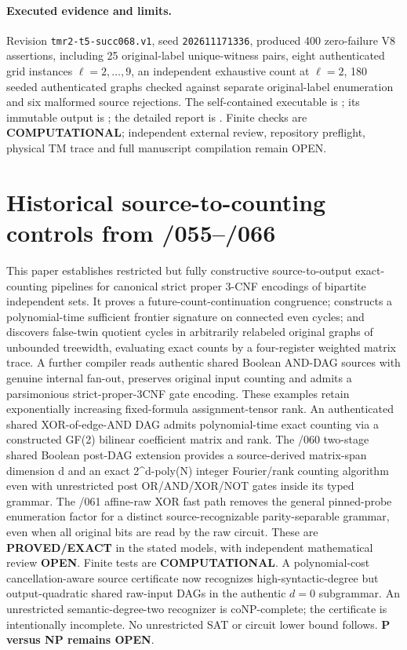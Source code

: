 \documentclass[11pt]{article}
\begin{document}
\paragraph{Executed evidence and limits.}
Revision \texttt{tmr2-t5-succ068.v1}, seed
\texttt{202611171336}, produced 400 zero-failure V8
assertions, including 25 original-label
unique-witness pairs, eight authenticated grid
instances $\ell=2,\ldots,9$, an independent
exhaustive count at $\ell=2$, 180 seeded
authenticated graphs checked against separate
original-label enumeration and six malformed
source rejections. The self-contained executable is
;
its immutable output is
;
the detailed report is
.
Finite checks are \textbf{COMPUTATIONAL}; independent
external review, repository preflight, physical TM
trace and full manuscript compilation remain OPEN.

\section{Historical source-to-counting controls from /055--/066}
This paper establishes restricted but fully constructive source-to-output exact-counting pipelines for canonical strict proper 3-CNF encodings of bipartite independent sets. It proves a future-count-continuation congruence; constructs a polynomial-time sufficient frontier signature on connected even cycles; and discovers false-twin quotient cycles in arbitrarily relabeled original graphs of unbounded treewidth, evaluating exact counts by a four-register weighted matrix trace. A further compiler reads authentic shared Boolean AND-DAG sources with genuine internal fan-out, preserves original input counting and admits a parsimonious strict-proper-3CNF gate encoding. These examples retain exponentially increasing fixed-formula assignment-tensor rank. An authenticated shared XOR-of-edge-AND DAG admits polynomial-time exact counting via a constructed GF(2) bilinear coefficient matrix and rank. The /060 two-stage shared Boolean post-DAG extension provides a source-derived matrix-span dimension d and an exact 2^d-poly(N) integer Fourier/rank counting algorithm even with unrestricted post OR/AND/XOR/NOT gates inside its typed grammar. The /061 affine-raw XOR fast path removes the general pinned-probe enumeration factor for a distinct source-recognizable parity-separable grammar, even when all original bits are read by the raw circuit. These are \textbf{PROVED/EXACT} in the stated models, with independent mathematical review \textbf{OPEN}. Finite tests are \textbf{COMPUTATIONAL}. A polynomial-cost cancellation-aware source certificate now recognizes high-syntactic-degree but output-quadratic shared raw-input DAGs in the authentic $d=0$ subgrammar. An unrestricted semantic-degree-two recognizer is coNP-complete; the certificate is intentionally incomplete. No unrestricted SAT or circuit lower bound follows. \textbf{P versus NP remains OPEN}.
\end{document}
